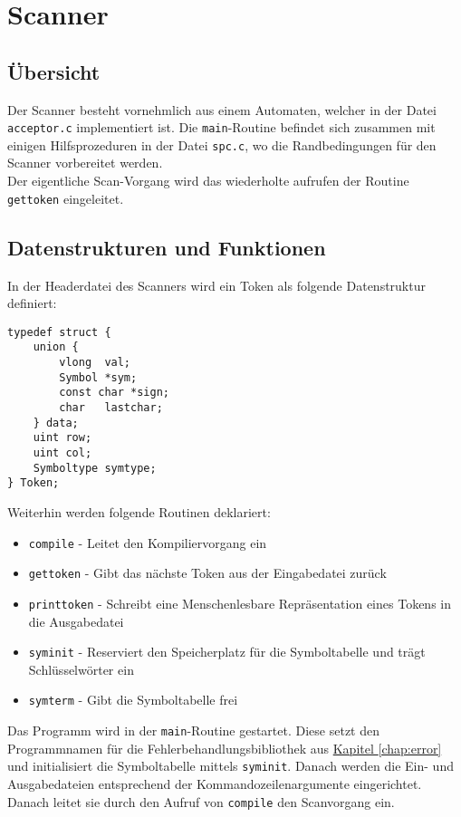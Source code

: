 \chapter{Scanner}
\label{chap:scanner}

\section{Übersicht}
\label{sec:scanner_overview}
Der Scanner besteht vornehmlich aus einem Automaten,
welcher in der Datei \texttt{acceptor.c} implementiert ist.
Die \texttt{main}-Routine befindet sich zusammen mit einigen Hilfsprozeduren in der Datei \texttt{spc.c},
wo die Randbedingungen für den Scanner vorbereitet werden. \\
Der eigentliche Scan-Vorgang wird das wiederholte aufrufen der Routine \texttt{gettoken} eingeleitet.

\section{Datenstrukturen und Funktionen}
\label{sec:scanner_datafunc}

In der Headerdatei des Scanners wird ein Token als folgende Datenstruktur definiert:

\begin{lstlisting}
typedef struct {
	union {
		vlong  val;
		Symbol *sym;
		const char *sign;
		char   lastchar;
	} data;
	uint row;
	uint col;
	Symboltype symtype;
} Token;
\end{lstlisting}

Weiterhin werden folgende Routinen deklariert:

\begin{itemize}
\item \texttt{compile} - Leitet den Kompiliervorgang ein
\item \texttt{gettoken} - Gibt das nächste Token aus der Eingabedatei zurück
\item \texttt{printtoken} - Schreibt eine Menschenlesbare Repräsentation eines Tokens in die Ausgabedatei
\item \texttt{syminit} - Reserviert den Speicherplatz für die Symboltabelle und trägt Schlüsselwörter ein
\item \texttt{symterm} - Gibt die Symboltabelle frei
\end{itemize}

Das Programm wird in der \texttt{main}-Routine gestartet.
Diese setzt den Programmnamen für die Fehlerbehandlungsbibliothek aus \hyperref[chap:error]{Kapitel \ref{chap:error}}
und initialisiert die Symboltabelle mittels \texttt{syminit}.
Danach werden die Ein- und Ausgabedateien entsprechend der Kommandozeilenargumente eingerichtet.
Danach leitet sie durch den Aufruf von \texttt{compile} den Scanvorgang ein.

